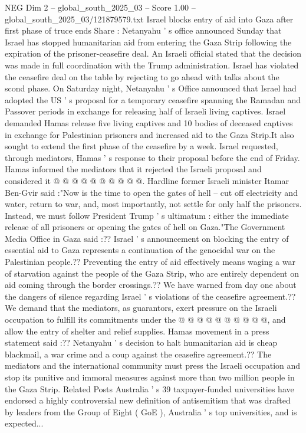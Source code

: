 \begin{textsample}{NEG Dim 2 – global\_south\_2025\_03 – Score 1.00 – global\_south\_2025\_03/121879579.txt}  \label{ex:f2_neg_159}
Israel blocks entry of aid into Gaza after first phase of truce ends Share : Netanyahu ' s office announced Sunday that Israel has stopped humanitarian aid from entering the Gaza Strip following the expiration of the prisoner-ceasefire deal.
An Israeli official stated that the decision was made in full coordination with the Trump administration.
Israel has violated the ceasefire deal on the table by rejecting to go ahead with talks about the scond phase.
On Saturday night, Netanyahu ' s Office announced that Israel had adopted the US ' s proposal for a temporary ceasefire spanning the Ramadan and Passover periods in exchange for releasing half of Israeli living captives.
Israel demanded Hamas release five living captives and 10 bodies of deceased captives in exchange for Palestinian prisoners and increased aid to the Gaza Strip.It also sought to extend the first phase of the ceasefire by a week.
Israel requested, through mediators, Hamas ' s response to their proposal before the end of Friday.
Hamas informed the mediators that it rejected the Israeli proposal and considered it @ @ @ @ @ @ @ @ @ @.
Hardline former Israeli minister Itamar Ben-Gvir said :"Now is the time to open the gates of hell -- cut off electricity and water, return to war, and, most importantly, not settle for only half the prisoners.
Instead, we must follow President Trump ' s ultimatum : either the immediate release of all prisoners or opening the gates of hell on Gaza."The Government Media Office in Gaza said :??
Israel ' s announcement on blocking the entry of essential aid to Gaza represents a continuation of the genocidal war on the Palestinian people.??
Preventing the entry of aid effectively means waging a war of starvation against the people of the Gaza Strip, who are entirely dependent on aid coming through the border crossings.??
We have warned from day one about the dangers of silence regarding Israel ' s violations of the ceasefire agreement.??
We demand that the mediators, as guarantors, exert pressure on the Israeli occupation to fulfill its commitments under the @ @ @ @ @ @ @ @ @ @, and allow the entry of shelter and relief supplies.
Hamas movement in a press statement said :??
Netanyahu ' s decision to halt humanitarian aid is cheap blackmail, a war crime and a coup against the ceasefire agreement.??
The mediators and the international community must press the Israeli occupation and stop its punitive and immoral measures against more than two million people in the Gaza Strip.
Related Posts Australia ' s 39 taxpayer-funded universities have endorsed a highly controversial new definition of antisemitism that was drafted by leaders from the Group of Eight ( GoE ), Australia ' s top universities, and is expected...

\end{textsample}
